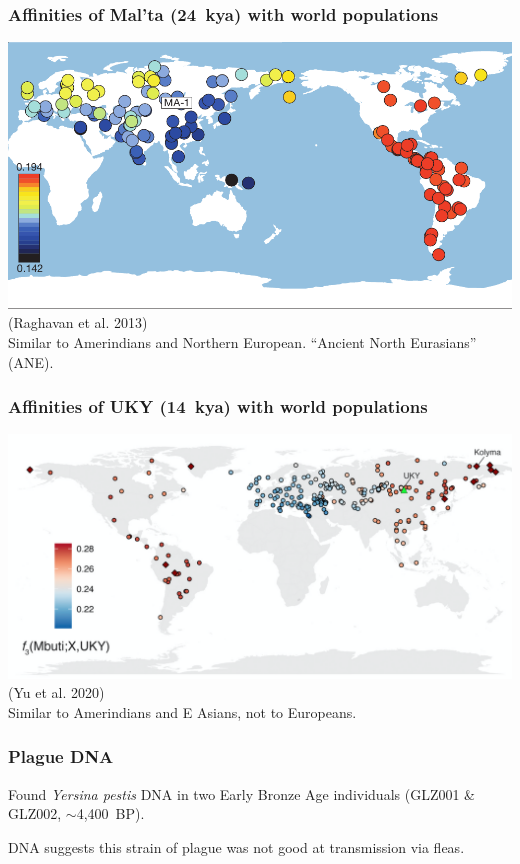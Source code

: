 \documentclass[pdftex,12pt,dvipsnames]{beamer}
\begin{document}
\begin{frame}
\frametitle{Affinities of Mal'ta (24~kya) with world populations}
\includegraphics[width=\linewidth]{malta-affinity.png}\\
\mbox{} \hfill {\small (Raghavan et al.{} 2013)}\\[1ex]
Similar to Amerindians and Northern European. ``Ancient North
Eurasians'' (ANE).
\end{frame}

\begin{frame}
\frametitle{Affinities of UKY (14~kya) with world populations}
\includegraphics[width=\linewidth]{yu20-UKYaffinity.png}\\
\mbox{} \hfill {\small (Yu et al.{} 2020)}\\[1ex]
Similar to Amerindians and E Asians, not to Europeans.
\end{frame}

\begin{frame}
  \frametitle{Plague DNA}

  Found \emph{Yersina pestis} DNA in two Early Bronze Age individuals
  (GLZ001 \& GLZ002, $\sim$4,400~BP).

  \bigskip

  DNA suggests this strain of plague was not good at transmission via
  fleas.
\end{frame}
\end{document}
